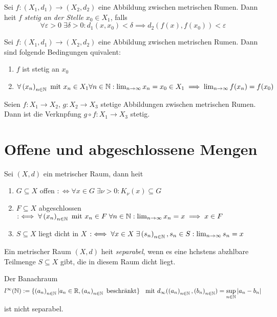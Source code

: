 \begin{definition}
	Sei \(f: (X_1, d_1) \to (X_2, d_2)\) eine Abbildung zwischen metrischen R\as umen. Dann hei\s t $f$ \textit{stetig an der Stelle} $x_0 \in X_1$, falls
	\[\forall \varepsilon > 0\;\exists \delta > 0: d_1(x, x_0) < \delta \implies d_2(f(x), f(x_0)) < \varepsilon\]
\end{definition}

\begin{theorem}
	Sei \(f: (X_1, d_1) \to (X_2, d_2)\) eine Abbildung zwischen metrischen R\as umen. Dann sind folgende Bedingungen \as quivalent:
	\begin{enumerate}[noitemsep]
		\item $f$ ist stetig an $x_0$
		\item $\forall \left (x_n\right )_{n\in \mathbb{N}} \text{ mit }x_n \in X_1 \forall n \in \mathbb{N} : \lim_{n \to \infty} x_n = x_0 \in X_1 \implies \lim_{n \to \infty} f(x_n) = f(x_0)$ 
	\end{enumerate}
\end{theorem}
\begin{theorem}
	Seien \(f: X_1 \to X_2\), \(g: X_2\to X_3\) stetige Abbildungen zwischen metrischen R\as umen. Dann ist die Verkn\us pfung \(g \circ f: X_1 \to X_3\) stetig. 
\end{theorem}

\section{Offene und abgeschlossene Mengen}
\begin{definition}
	Sei \((X,d)\) ein metrischer Raum, dann hei\s t 
	\begin{enumerate}[noitemsep]
		\item \(G \subseteq X \) offen \(:\iff \forall x \in G\; \exists \nu > 0: K_\nu(x) \subseteq G\)
		\item \(F \subseteq X\) abgeschlossen \(:\iff \forall \left (x_n\right )_{n\in \mathbb{N}} \text{ mit } x_n \in F \;\forall n \in \mathbb{N}: \lim_{n \to \infty} x_n = x \implies x \in F\)
		\item $S \subseteq X$ liegt dicht in $X$ \(:\iff \forall x \in X \;\exists \left (s_n\right )_{n\in \mathbb{N}}, s_n \in S: \lim_{n \to \infty} s_n = x \)
	\end{enumerate}
\end{definition}

\begin{definition}
	Ein metrischer Raum \((X, d)\) hei\s t \textit{separabel}, wenn es eine h\os chstens abz\as hlbare Teilmenge \(S\subseteq X\) gibt, die in diesem Raum dicht liegt.
\end{definition}
\begin{ex}
	Der Banachraum 
	\[l^\infty(\mathbb{N}) := \{\left (a_n\right )_{n\in \mathbb{N}} \vert a_n \in \mathbb{R}, \left (a_n\right )_{n\in \mathbb{N}} \text { beschr{\"a}nkt}\} \;\; \text{ mit } d_\infty(\left (a_n\right )_{n\in \mathbb{N}}, \left (b_n\right )_{n\in \mathbb{N}}) = \sup_{n\in \mathbb{N}} \left\lvert a_n - b_n \right\rvert\] 
	ist nicht separabel.
\end{ex}

